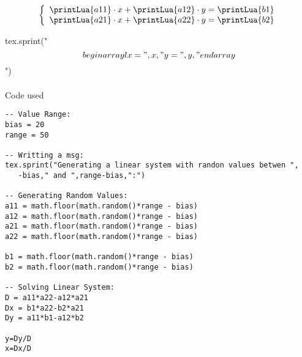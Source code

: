 \documentclass{article}
\begin{document}
\begin{equation}
\left\{
\begin{array}{l}
\printLua{a11}\cdot x + \printLua{a12} \cdot y = \printLua{b1}\\
\printLua{a21}\cdot x + \printLua{a22} \cdot y = \printLua{b2}\\
\end{array}
\right.
\end{equation}

\begin{luacode}
tex.sprint("$$\\begin{array}{l}x = ",x,"\\\\y = ",y,"\\end{array}$$")
\end{luacode}

\paragraph{}Code used

\begin{verbatim}
-- Value Range:
bias = 20
range = 50 

-- Writting a msg:
tex.sprint("Generating a linear system with randon values betwen ",
   -bias," and ",range-bias,":")

-- Generating Random Values:
a11 = math.floor(math.random()*range - bias)
a12 = math.floor(math.random()*range - bias)
a21 = math.floor(math.random()*range - bias)
a22 = math.floor(math.random()*range - bias)

b1 = math.floor(math.random()*range - bias)
b2 = math.floor(math.random()*range - bias)

-- Solving Linear System:
D = a11*a22-a12*a21
Dx = b1*a22-b2*a21
Dy = a11*b1-a12*b2

y=Dy/D
x=Dx/D
\end{verbatim}
\end{document}
